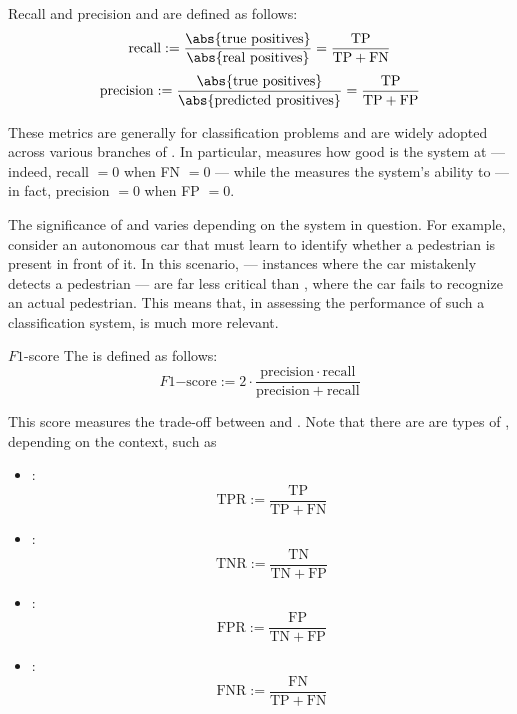 \documentclass[a4paper, 12pt]{report}
\begin{document}
    \begin{frameddefn}{Recall and precision}
         and  are defined as follows: $$\mathrm{recall} := \dfrac{\abs{\mathrm{true \ positives}}}{\abs{\mathrm{real \ positives}}} = \dfrac{\mathrm{TP}}{\mathrm{TP} + \mathrm{FN}}$$ $$\mathrm{precision} := \dfrac{\abs{\mathrm{true \ positives}}}{\abs{\mathrm{predicted \ prositives}}} = \dfrac{\mathrm{TP}}{\mathrm{TP} + \mathrm{FP}}$$
    \end{frameddefn}

    These metrics are generally  for classification problems and are widely adopted across various branches of . In particular,  measures how good is the system at  --- indeed, recall $= 0$ when FN $= 0$ --- while the  measures the system's ability to  --- in fact, precision $= 0$ when FP $= 0$.

    The significance of  and  varies depending on the system in question. For example, consider an autonomous car that must learn to identify whether a pedestrian is present in front of it. In this scenario,  --- instances where the car mistakenly detects a pedestrian --- are far less critical than , where the car fails to recognize an actual pedestrian. This means that, in assessing the performance of such a classification system,  is much more relevant.

    \begin{frameddefn}{$F1$-score}
        The  is defined as follows: $$F1\mathrm{-score} := 2 \cdot \dfrac{\mathrm{precision} \cdot \mathrm{recall}}{\mathrm{precision} + \mathrm{recall}}$$
    \end{frameddefn}

    This score measures the trade-off between  and . Note that there are are types of , depending on the context, such as
    
    \begin{itemize}
        \item {}: $$\mathrm{TPR} := \dfrac{\mathrm{TP}}{\mathrm{TP} + \mathrm{FN}}$$
        \item {}: $$\mathrm{TNR} := \dfrac{\mathrm{TN}}{\mathrm{TN} + \mathrm{FP}}$$
        \item {}: $$\mathrm{FPR} := \dfrac{\mathrm{FP}}{\mathrm{TN} + \mathrm{FP}}$$
        \item {}: $$\mathrm{FNR} := \dfrac{\mathrm{FN}}{\mathrm{TP} + \mathrm{FN}}$$
    \end{itemize}
\end{document}
